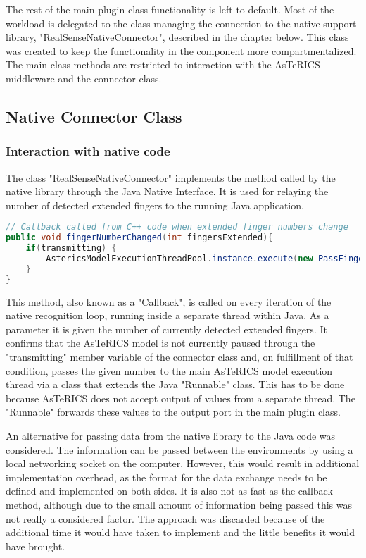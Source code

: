 \documentclass[BSA,Bachelor,english]{twbook}%
\begin{document}
The rest of the main plugin class functionality is left to default. Most of the workload is delegated to the class managing the connection to the native support library, "RealSenseNativeConnector", described in the chapter below. This class was created to keep the functionality in the component more compartmentalized. The main class methods are restricted to interaction with the AsTeRICS middleware and the connector class.

\subsection{Native Connector Class}

\subsubsection{Interaction with native code}

The class "RealSenseNativeConnector" implements the method called by the native library through the Java Native Interface. It is used for relaying the number of detected extended fingers to the running Java application.

\begin{lstlisting}[language=Java,name={Java Native Interface callback method},label={rs:javaplugin:3}]
// Callback called from C++ code when extended finger numbers change
public void fingerNumberChanged(int fingersExtended){
	if(transmitting) {
		AstericsModelExecutionThreadPool.instance.execute(new PassFingersRunnable(fingersExtended));
	}
}
\end{lstlisting}

This method, also known as a "Callback", is called on every iteration of the native recognition loop, running inside a separate thread within Java. As a parameter it is given the number of currently detected extended fingers. It confirms that the AsTeRICS model is not currently paused through the "transmitting" member variable of the connector class and, on fulfillment of that condition, passes the given number to the main AsTeRICS model execution thread via a class that extends the Java "Runnable" class. This has to be done because AsTeRICS does not accept output of values from a separate thread. The "Runnable" forwards these values to the output port in the main plugin class.

An alternative for passing data from the native library to the Java code was considered. The information can be passed between the environments by using a local networking socket on the computer. However, this would result in additional implementation overhead, as the format for the data exchange needs to be defined and implemented on both sides. It is also not as fast as the callback method, although due to the small amount of information being passed this was not really a considered factor. The approach was discarded because of the additional time it would have taken to implement and the little benefits it would have brought.
\end{document}
